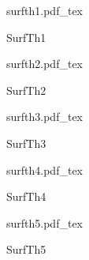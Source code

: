 \documentclass[12pt,a4paper]{article}
\newcommand{\incfig}[1]{%
    \def\svgwidth{\columnwidth}
    {#1.pdf_tex}
}
\begin{document}
\begin{figure}[ht]
    \centering
	\begin{minipage}[c][\totalheight][c]{\columnwidth}
    \incfig{surfth1}
    \caption{SurfTh1}
	\end{minipage}
    \label{fig:surfth1}
\end{figure}

\begin{figure}[ht]
    \centering
	\begin{minipage}[c][\totalheight][c]{\columnwidth}
    \incfig{surfth2}
    \caption{SurfTh2}
	\end{minipage}
    \label{fig:surfth2}
\end{figure}

\begin{figure}[ht]
    \centering
	\begin{minipage}[c][\totalheight][c]{\columnwidth}
    \incfig{surfth3}
    \caption{SurfTh3}
	\end{minipage}
    \label{fig:surfth3}
\end{figure}

\begin{figure}[ht]
    \centering
	\begin{minipage}[c][\totalheight][c]{\columnwidth}
    \incfig{surfth4}
    \caption{SurfTh4}
	\end{minipage}
    \label{fig:surfth4}
\end{figure}

\begin{figure}[ht]
    \centering
    \incfig{surfth5}
    \caption{SurfTh5}
    \label{fig:surfth5}
\end{figure}
\end{document}
